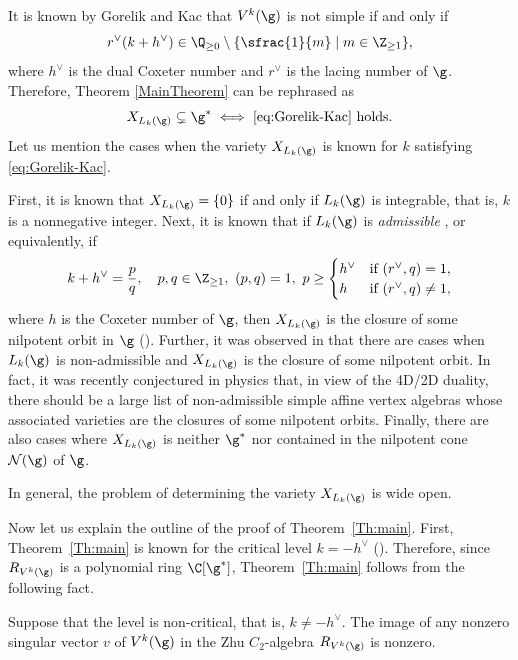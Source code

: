 It is known by Gorelik and Kac \cite{GorKac07}
that $V^k(\g)$
is not simple if and only if
\begin{equation}
r^{\vee}(k+h^{\vee}) \in \Q_{\geq 0}\setminus\{\sfrac{1}{m}\mid m\in \Z_{\geq 1}\},
\label{eq:Gorelik-Kac}
\end{equation}
where
$h^{\vee}$ is the dual Coxeter number and
$r^{\vee}$ is the lacing number of $\g$.
Therefore,
Theorem \ref{MainTheorem} can be rephrased as
\begin{equation}
X_{L_k(\g)}\subsetneq \g^*\iff \text{\eqref{eq:Gorelik-Kac} holds.}
\end{equation}
Let us mention the cases when the variety $X_{L_k(\g)}$
is known
for $k$ satisfying \eqref{eq:Gorelik-Kac}.

First, it is known \cite{Zhu96,DonMas06} that $X_{L_k(\g)}=\{0\}$
if and only if $L_k(\g)$ is integrable, that is,
$k$ is a nonnegative integer.
Next, it is known that if $L_k(\g)$ is \emph{admissible} \cite{KacWak89},
or equivalently,
if
\begin{equation*}
k+h^{\vee}=\frac{p}{q},\quad p,q\in \Z_{\geq 1}, \ (p,q)=1,\
p\geq \begin{cases}h^{\vee}&\text{if }(r^{\vee},q)=1,\\
h&\text{if }(r^{\vee},q)\ne 1,
\end{cases}
\end{equation*}
where $h$ is the Coxeter number of $\g$,
then
$X_{L_k(\g)}$ is the closure of some nilpotent orbit in $\g$ (\cite{Ara09b}).
Further, it was observed in \cite{AM15,AM17}
that
there are cases when $L_k(\g)$ is
non-admissible and
$X_{L_k(\g)}$ is the closure of some nilpotent orbit.
In fact,
it was recently
conjectured in physics \cite{XieYan2019lisse} that,
in view of the 4D/2D duality,
there should be
a large list of non-admissible simple affine vertex algebras
whose associated varieties are the closures of some nilpotent orbits.
Finally,
there are also cases \cite{AM16} where $X_{L_k(\g)}$
is neither $\g^*$ nor contained in the nilpotent cone $\mathcal{N}(\g)$
of $\g$.

In general,
the problem of determining the variety $X_{L_k(\g)}$ is wide open.

Now let us explain
the outline of
the proof of Theorem~\ref{Th:main}.
First, Theorem~\ref{Th:main} is known for the critical level $k=-h^\vee$
(\cite{FeiFre92,FreGai04}). Therefore, since $R_{V^k(\g)}$ is a polynomial ring $\C[\g^*]$,
Theorem~\ref{Th:main} follows from the following fact.
\begin{theorem}\label{theorem:image-of-the-singular}
Suppose that the level is non-critical, that is, $k\ne -h^\vee$.
The image of any nonzero singular vector $v$ of $V^k(\g)$
in the Zhu $C_2$-algebra $R_{V^k(\g)}$ is nonzero.
\end{theorem}

